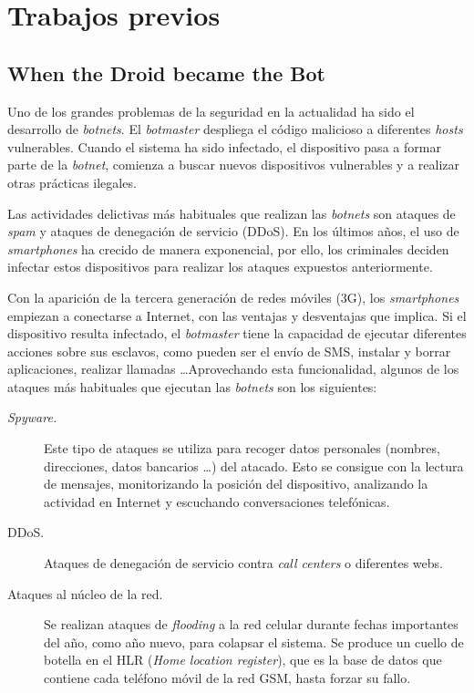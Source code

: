 \documentclass[a4paper,11pt]{report}
\begin{document}
\chapter{Trabajos previos} \label{tPrevios}

\section{When the Droid became the Bot}

Uno de los grandes problemas de la seguridad en la actualidad ha sido el desarrollo de \emph{botnets}. El \emph{botmaster} despliega el código malicioso a diferentes \emph{hosts} vulnerables. Cuando el sistema ha sido infectado, el dispositivo pasa a formar parte de la \emph{botnet}, comienza a buscar nuevos dispositivos vulnerables y a realizar otras prácticas ilegales.

Las actividades delictivas más habituales que realizan las \emph{botnets} son ataques de \emph{spam} y ataques de denegación de servicio (DDoS). En los últimos años, el uso de \emph{smartphones} ha crecido de manera exponencial, por ello, los criminales deciden infectar estos dispositivos para realizar los ataques expuestos anteriormente.

Con la aparición de la tercera generación de redes móviles (3G), los \emph{smartphones} empiezan a conectarse a Internet, con las ventajas y desventajas que implica. Si el dispositivo resulta infectado, el \emph{botmaster} tiene la capacidad de ejecutar diferentes acciones sobre sus esclavos, como pueden ser el envío de SMS, instalar y borrar aplicaciones, realizar llamadas \ldots Aprovechando esta funcionalidad, algunos de los ataques más habituales que ejecutan las \emph{botnets} son los siguientes:

\begin{description}
\item[\emph{Spyware.}] Este tipo de ataques se utiliza para recoger datos personales (nombres, direcciones, datos bancarios \ldots) del atacado. Esto se consigue con la lectura de mensajes, monitorizando la posición del dispositivo, analizando la actividad en Internet y escuchando conversaciones telefónicas.
\item[DDoS.] Ataques de denegación de servicio contra \emph{call centers} o diferentes webs.
\item[Ataques al núcleo de la red.] Se realizan ataques de \emph{flooding} a la red celular durante fechas importantes del año, como año nuevo, para colapsar el sistema. Se produce un cuello de botella en el HLR (\emph{Home location register}), que es la base de datos que contiene cada teléfono móvil de la red GSM, hasta forzar su fallo.
\end{description}
\end{document}
